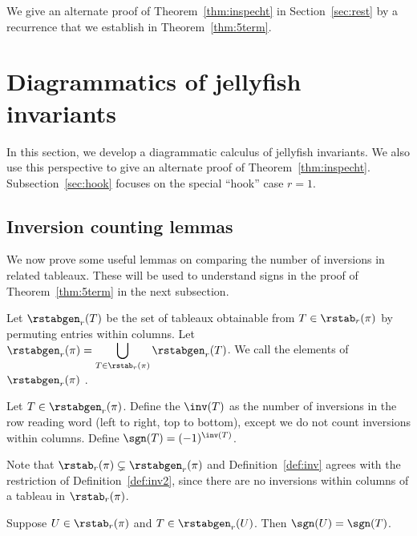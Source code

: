 We give an alternate proof of Theorem~\ref{thm:inspecht} in Section~\ref{sec:rest} by a recurrence that we establish in Theorem~\ref{thm:5term}.

\section{Diagrammatics of jellyfish invariants}\label{sec:diagrammatics}

In this section, we develop a diagrammatic calculus of jellyfish invariants. We also use this perspective to give an alternate proof of Theorem~\ref{thm:inspecht}. Subsection~\ref{sec:hook} focuses on the special ``hook'' case $r=1$.

\subsection{Inversion counting lemmas}
\label{sec:lemmas}

We now prove some useful lemmas on comparing the number of inversions in related tableaux. These will be used to understand signs in the proof of Theorem~\ref{thm:5term} in the next subsection.

\begin{definition}
Let $\rstabgen_r(T)$ be the set of tableaux obtainable from $T\in\rstab_r(\pi)$ by permuting entries within columns. Let $\rstabgen_r(\pi)=\displaystyle\bigcup_{T\in\rstab_r(\pi)}\rstabgen_r(T)$. We call the elements of $\rstabgen_r(\pi)$ .
\end{definition}

\begin{definition}
\label{def:inv2}
Let $T\in \rstabgen_r(\pi)$. Define the  $\inv(T)$ as the number of inversions in the row reading word (left to right, top to bottom), except we do not count inversions within columns. Define $\sgn(T)=(-1)^{\inv(T)}$.
\end{definition}


Note that $\rstab_r(\pi) \subsetneq \rstabgen_r(\pi)$ and Definition~\ref{def:inv} agrees with the restriction of Definition~\ref{def:inv2}, since there are no inversions within columns of a tableau in $\rstab_r(\pi)$.


\begin{lemma}
\label{lem:row_col_swap}
Suppose $U\in \rstab_r(\pi)$ and $T\in \rstabgen_r(U)$. Then $\sgn(U)=\sgn(T)$.
\end{lemma}

